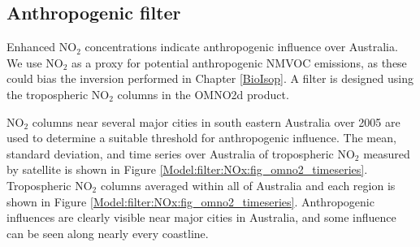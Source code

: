     
    
    
  
      
    
    
  \subsection{Anthropogenic filter}
    \label{Model:filter:NOx}
    
    Enhanced NO$_2$ concentrations indicate anthropogenic influence over Australia.
    We use NO$_2$ as a proxy for potential anthropogenic NMVOC emissions, as these could bias the inversion performed in Chapter \ref{BioIsop}.
    A filter is designed using the tropospheric NO$_2$ columns in the OMNO2d product.
    
    NO$_2$ columns near several major cities in south eastern Australia over 2005 are used to determine a suitable threshold for anthropogenic influence.
    The mean, standard deviation, and time series over Australia of tropospheric NO$_2$ measured by satellite is shown in Figure \ref{Model:filter:NOx:fig_omno2_timeseries}.
    Tropospheric NO$_2$ columns averaged within all of Australia and each region is shown in Figure \ref{Model:filter:NOx:fig_omno2_timeseries}.
    Anthropogenic influences are clearly visible near major cities in Australia, and some influence can be seen along nearly every coastline.
    
